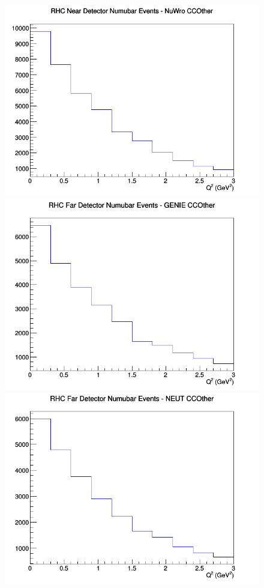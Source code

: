 \begin{figure}[h]
\includegraphics[width=\linewidth]{eff_Q2/GAr/CCOther_RHC_ND_numubar_Q2_NuWro.png}
\endminipage
\newline
{}
\includegraphics[width=\linewidth]{eff_Q2/GAr/CCOther_RHC_FD_numubar_Q2_GENIE.png}
\endminipage
{}
\includegraphics[width=\linewidth]{eff_Q2/GAr/CCOther_RHC_FD_numubar_Q2_NEUT.png}

\end{figure}
